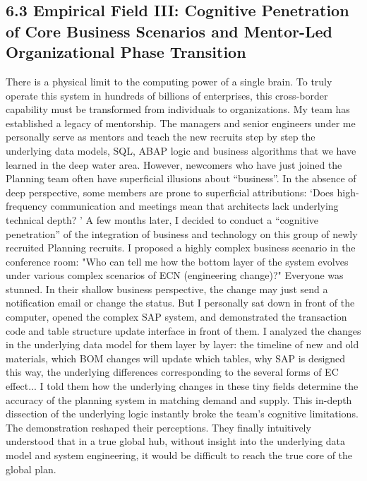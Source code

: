 \documentclass[11pt,a4paper]{article}
\begin{document}
\subsection*{6.3 Empirical Field III: Cognitive Penetration of Core Business Scenarios and Mentor-Led Organizational Phase Transition}


There is a physical limit to the computing power of a single brain. To truly operate this system in hundreds of billions of enterprises, this cross-border capability must be transformed from individuals to organizations. My team has established a legacy of mentorship. The managers and senior engineers under me personally serve as mentors and teach the new recruits step by step the underlying data models, SQL, ABAP logic and business algorithms that we have learned in the deep water area. However, newcomers who have just joined the Planning team often have superficial illusions about “business”. In the absence of deep perspective, some members are prone to superficial attributions: ‘Does high-frequency communication and meetings mean that architects lack underlying technical depth? ’ A few months later, I decided to conduct a “cognitive penetration” of the integration of business and technology on this group of newly recruited Planning recruits. I proposed a highly complex business scenario in the conference room: "Who can tell me how the bottom layer of the system evolves under various complex scenarios of ECN (engineering change)?" Everyone was stunned. In their shallow business perspective, the change may just send a notification email or change the status. But I personally sat down in front of the computer, opened the complex SAP system, and demonstrated the transaction code and table structure update interface in front of them. I analyzed the changes in the underlying data model for them layer by layer: the timeline of new and old materials, which BOM changes will update which tables, why SAP is designed this way, the underlying differences corresponding to the several forms of EC effect... I told them how the underlying changes in these tiny fields determine the accuracy of the planning system in matching demand and supply. This in-depth dissection of the underlying logic instantly broke the team’s cognitive limitations. The demonstration reshaped their perceptions. They finally intuitively understood that in a true global hub, without insight into the underlying data model and system engineering, it would be difficult to reach the true core of the global plan.
\end{document}
